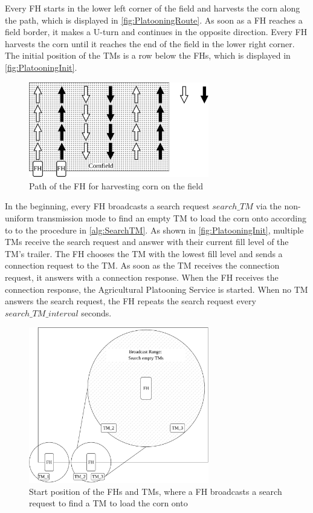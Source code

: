 Every \ac{FH} starts in the lower left corner of the field and harvests the corn along the path,
which is displayed in \autoref{fig:PlatooningRoute}.
As soon as a \ac{FH} reaches a field border, it makes a U-turn and continues
in the opposite direction.
Every \ac{FH} harvests the corn until it reaches the end of the field in the lower right corner.
The initial position of the \ac{TM}s is a row below the \ac{FH}s, which is displayed in \autoref{fig:PlatooningInit}.
\begin{figure}[H]%
   \centering
   \includegraphics[width=0.7\textwidth]{figures/drawings-Route}
   \caption{Path of the \acf{FH} for harvesting corn on the field}
   \label{fig:PlatooningRoute}%
\end{figure}

In the beginning, every \ac{FH} broadcasts a search request $search\_TM$ via the non-uniform transmission mode to find an empty \ac{TM} to load the corn onto according to
to the procedure in \autoref{alg:SearchTM}.
As shown in \autoref{fig:PlatooningInit}, multiple \ac{TM}s receive the search request and answer with
their current fill level of the \ac{TM}'s trailer.
The \ac{FH} chooses the \ac{TM} with the lowest fill level and sends a connection request to the \ac{TM}.
As soon as the \ac{TM} receives the connection request, it answers with a connection response.
When the \ac{FH} receives the connection response, the Agricultural Platooning Service is started.
When no \ac{TM} answers the search request, the \ac{FH} repeats the search request every $search\_TM\_interval$ seconds.

\begin{figure}[H]%
   \centering
   \includegraphics[width=0.7\textwidth]{figures/platoonINIT}
   \caption{Start position of the \acf{FH}s and \acf{TM}s, where a \ac{FH} broadcasts a search request to find
   a \ac{TM} to load the corn onto}
   \label{fig:PlatooningInit}%
\end{figure}

